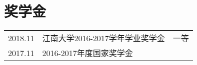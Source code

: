 \documentclass[]{deedy-resume-openfont}
\begin{document}
\begin{minipage}[t]{0.73\textwidth}
	\section{奖学金}
    \begin{tabular}{lll}
        2018.11 & 江南大学2016-2017学年学业奖学金 & 一等 \\
        2017.11 & 2016-2017年度国家奖学金 & \\
	\end{tabular}
    \sectionsep
\end{minipage}
\end{document}
